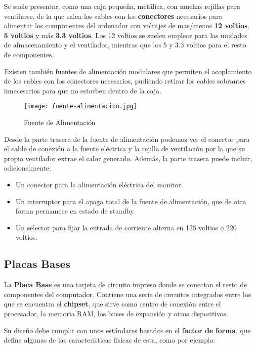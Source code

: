 Se suele presentar, como una caja pequeña, metálica, con muchas rejillas para ventilarse, de la que salen los cables con los \textbf{conectores} necesarios para alimentar los componentes del ordenador con voltajes de mas/menos \textbf{12 voltios}, \textbf{5 voltios} y más \textbf{3.3 voltios}. Los 12 voltios se suelen emplear para las unidades de almacenamiento y el ventilador, mientras que los 5 y 3.3 voltios para el resto de componentes.

Existen también fuentes de alimentación modulares que permiten el acoplamiento de los cables con los conectores necesarios, pudiendo retirar los cables sobrantes innecesarios para que no estorben dentro de la caja.

\begin{figure}[ht]
    \centering
    \texttt{[image: fuente-alimentacion.jpg]}
    \caption{Fuente de Alimentación}
\end{figure}

Desde la parte trasera de la fuente de alimentación podemos ver el conector para el cable de conexión a la fuente eléctrica y la rejilla de ventilación por la que su propio ventilador extrae el calor generado. Además, la parte trasera puede incluir, adicionalmente:

\begin{itemize}
    \item Un conector para la alimentación eléctrica del monitor.
    \item Un interruptor para el apaga total de la fuente de alimentación, que de otra forma permanece en estado de standby.
    \item Un selector para fijar la entrada de corriente alterna en 125 voltios o 220 voltios.
\end{itemize}

\subsection{Placas Bases}
La \textbf{Placa Base} es una tarjeta de circuito impreso donde se conectan el resto de componentes del computador. Contiene una serie de circuitos integrados entre los que se encuentra el \textbf{chipset}, que sirve como centro de conexión entre el procesador, la memoria RAM, los buses de expansión y otros dispositivos.

Su diseño debe cumplir con unos estándares basados en el \textbf{factor de forma}, que define algunas de las características físicas de esta, como por ejemplo:

